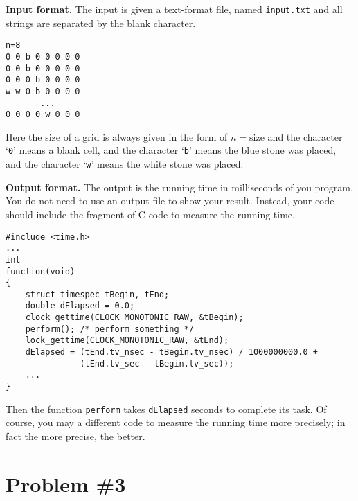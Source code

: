 \documentclass{article}
\begin{document}
\bigskip
\noindent\textbf{Input format.} %
The input is given a text-format file, named \texttt{input.txt} and all strings are separated by the blank character.
\begin{lstlisting}
n=8
0 0 b 0 0 0 0 0
0 0 b 0 0 0 0 0
0 0 0 b 0 0 0 0
w w 0 b 0 0 0 0
       ...
0 0 0 0 w 0 0 0 
\end{lstlisting}
Here the size of a grid is always given in the form of $n=\text{size}$ and the character `\texttt{0}' means a blank cell, and 
the character `\texttt{b}' means the blue stone was placed, and the character `\texttt{w}' means the white stone was placed.

\bigskip
\noindent\textbf{Output format.} %
The output is the running time in milliseconds of you program.
You do not need to use an output file to show your result. Instead, your code should include 
the fragment of C code to measure the running time.

\begin{verbatim} 
#include <time.h>
...
int 
function(void)
{
    struct timespec tBegin, tEnd;
    double dElapsed = 0.0;
    clock_gettime(CLOCK_MONOTONIC_RAW, &tBegin);
    perform(); /* perform something */
    lock_gettime(CLOCK_MONOTONIC_RAW, &tEnd);
    dElapsed = (tEnd.tv_nsec - tBegin.tv_nsec) / 1000000000.0 + 
               (tEnd.tv_sec - tBegin.tv_sec)); 
    ...
}
\end{verbatim}
Then the function \texttt{perform} takes \texttt{dElapsed} seconds to complete its task. 
Of course, you may a different code to measure the running time more precisely; in fact the more precise, the better.

\newpage
\section{Problem \#3}
\end{document}
